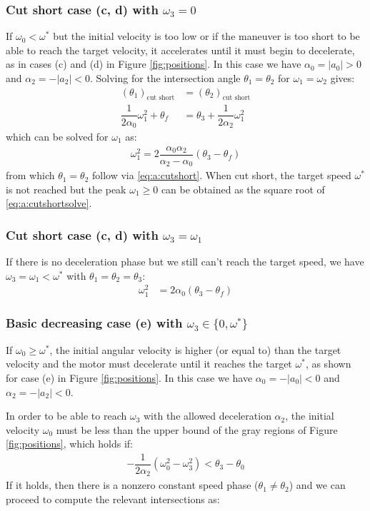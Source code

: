 \documentclass[12pt, a4paper]
{article}
\providecommand{\lr}[1]{\left(#1\right)}
\providecommand{\sub}[1]{_{\text{#1}}}
\providecommand{\w}{\omega}
\providecommand{\wt}{\w^*}
\renewcommand{\th}{\theta}
\renewcommand{\a}{\alpha}
\providecommand{\abs}[1]{\left|#1\right|}
\begin{document}
\subsubsection{Cut short case (c, d) with $\w_3 = 0$}
\label{sec:a:cutshortw3is0}
If $\w_0 < \wt$ but the initial velocity is too low or if the
maneuver is too short to be able to reach the target velocity, it accelerates
until it must begin to decelerate, as in cases (c) and (d) in
Figure \ref{fig:positions}.
In this case we have $\a_0 = \abs{a_0} > 0$ and $\a_2 = -\abs{a_2} < 0$.
Solving for the intersection angle $\th_1=\th_2$ for $\w_1=\w_2$ gives:
%
\begin{align}
    \label{eq:a:cutshort}
    \lr{\th_1}\sub{cut short} &= \lr{\th_2}\sub{cut short}\\[1em]
    \dfrac{1}{2\a_0}\w_1^2 + \th_f  &= \th_3 + \dfrac{1}{2\a_2} \w_1^2 
\end{align}
%
which can be solved for $\w_1$ as:
%
\begin{align}
    \label{eq:a:cutshortsolve}
    \w_1^2 = 2 \dfrac{\a_0\a_2}{\a_2-\a_0}\lr{\th_3 - \th_f}
\end{align}
%
from which $\th_1=\th_2$ follow via \eqref{eq:a:cutshort}.
%
When cut short, the target speed $\wt$ is not reached but the
peak $\w_1 \geq 0$ can be obtained as the square root
of \eqref{eq:a:cutshortsolve}.
%
\subsubsection{Cut short case (c, d) with $\w_3 = \w_1$}
\label{sec:a:cutshortw3isw1}

If there is no deceleration phase but we still can't reach the target speed,
we have $\w_3=\w_1 < \wt$ with $\th_1=\th_2=\th_3$:
%
\begin{align}
    \label{eq:a:cutshortw1}
    \w_1^2  &= 2\a_0\lr{\th_3 - \th_f}
\end{align}

\subsubsection{Basic decreasing case (e)  with $\w_3 \in \{0, \wt\}$}
\label{sec:a:decreasing}
If $\w_0 \geq \wt$, the initial angular velocity is higher (or equal to) than
the target velocity and the motor must decelerate until it reaches the target
$\wt$, as shown for case (e) in Figure \ref{fig:positions}.
In this case we have $\a_0 = -\abs{a_0} < 0$ and $\a_2 = -\abs{a_2} < 0$.

In order to be able to reach $\w_3$ with the allowed deceleration $\a_2$,
the initial velocity $\w_0$ must be less than the upper bound of the
gray regions of Figure \ref{fig:positions}, which holds if:
%
\begin{align}
    \label{eq:a:decreaselimit}
    - \dfrac{1}{2 \a_2}\lr{\w_0^2 - \w_3^2} < \th_3 - \th_0
\end{align}
%
If it holds, then there is a nonzero constant speed phase ($\th_1 \neq \th_2$)
and we can proceed to compute the relevant intersections as: 
\end{document}
